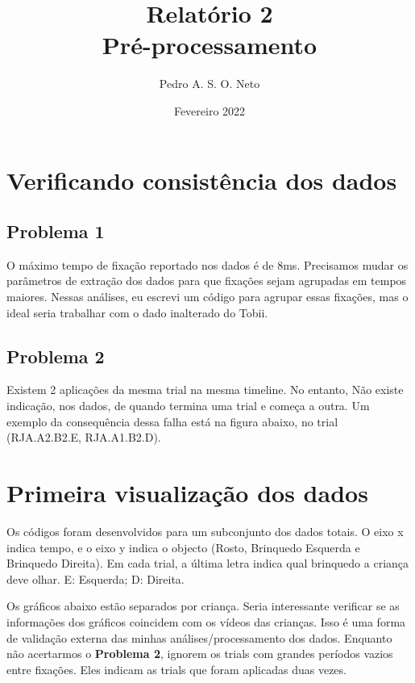 \documentclass{article}
\title{Relatório 2 \\ Pré-processamento}
\author{Pedro A. S. O. Neto}
\date{Fevereiro 2022}
\begin{document}
\maketitle

\section{Verificando consistência dos dados}

\subsection{Problema 1} 
O máximo tempo de fixação reportado nos dados é de 8ms. Precisamos mudar os parâmetros de extração dos dados para que fixações sejam agrupadas em tempos maiores. Nessas análises, eu escrevi um código para agrupar essas fixações, mas o ideal seria trabalhar com o dado inalterado do Tobii.

\subsection{Problema 2}
Existem 2 aplicações da mesma trial na mesma timeline. No entanto, Não existe indicação, nos dados, de quando termina uma trial e começa a outra. Um exemplo da consequência  dessa falha está na figura abaixo, no trial (RJA.A2.B2.E, RJA.A1.B2.D).

\section{Primeira visualização dos dados}

Os códigos foram desenvolvidos para um subconjunto dos dados totais. O eixo x indica tempo, e o eixo y indica o objecto (Rosto, Brinquedo Esquerda e Brinquedo Direita). Em cada trial, a última letra indica qual brinquedo a criança deve olhar. E: Esquerda; D: Direita.

Os gráficos abaixo estão separados por criança. Seria interessante verificar se as informações dos gráficos coincidem com os vídeos das crianças. Isso é uma forma de validação externa das minhas análises/processamento dos dados. Enquanto não acertarmos o \textbf{Problema 2}, ignorem os trials com grandes períodos vazios entre fixações. Eles indicam as trials que foram aplicadas duas vezes.
\end{document}
